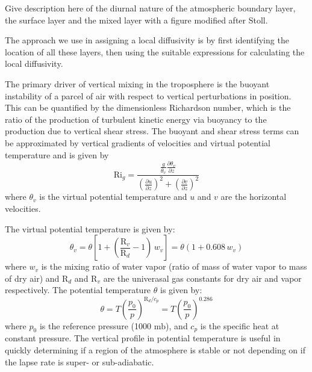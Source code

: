 Give description here of the diurnal nature of the atmospheric boundary layer, the surface
layer and the mixed layer with a figure modified after Stoll.

The approach we use in assigning a local diffusivity is by first identifying the location
of all these layers, then using the suitable expressions for calculating the local
diffusivity.

The primary driver of vertical mixing in the troposphere is the buoyant instability of a parcel
of air with respect to vertical perturbations in position. This can be quantified
by the dimensionless Richardson number, which is the ratio of the production of turbulent
kinetic energy via buoyancy to the production due to vertical shear stress.
The buoyant and shear stress terms can be approximated by vertical gradients of velocities
and virtual potential temperature and is given by
\begin{equation}\label{VarDiff_Eq_Rig}
\mathrm{Ri}_g = \frac{\frac{g}{\theta_v}\frac{\partial \theta_v}{\partial z}}
{\left( \frac{\partial u}{\partial z}\right)^2 + \left( \frac{\partial v}{\partial z}\right)^2}
\end{equation}
where $\theta_v$ is the virtual potential temperature and $u$ and $v$ are the horizontal velocities.

The virtual potential temperature is given by:
\begin{equation}\label{VarDiff_Eq_Thetav}
\theta_v = \theta \left[ 1 + \left( \frac{\mathrm{R}_{v}}{\mathrm{R}_{d}}-1\right) \, w_v \right] = \theta \left( 1 + 0.608 \, w_v \right)
\end{equation}
where $w_v$ is the mixing ratio of water vapor
(ratio of mass of water vapor to mass of dry air) %
and $\mathrm{R}_{d}$ and $\mathrm{R}_{v}$ are the univerasal gas constants for dry air and vapor respectively.
The potential temperature $\theta$ is given by:
\begin{equation}\label{VarDiff_Eq_Theta}
\theta = T \left( \frac{p_0}{p}\right)^{\mathrm{R}_{d}/c_p} = T \left( \frac{p_0}{p}\right)^{0.286}
\end{equation}
where $p_0$ is the reference pressure (1000 $\mathrm{mb}$), and $c_p$ is the specific heat at constant pressure.
The vertical profile in potential temperature is useful in quickly determining if a region of the
atmosphere is stable or not depending on if the lapse rate is super- or sub-adiabatic.

